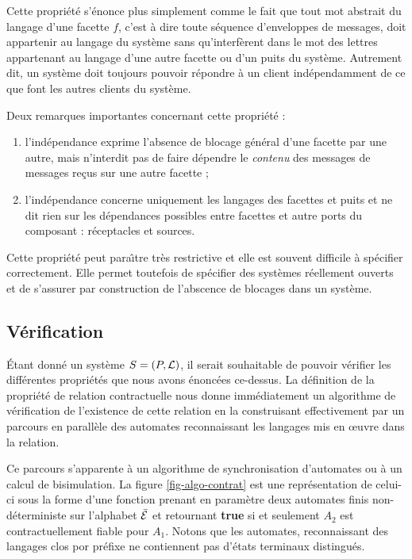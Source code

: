 Cette propri\'et\'e s'\'enonce plus simplement comme le fait que
tout mot abstrait du langage d'une facette $f$, c'est \`a dire toute
s\'equence d'enveloppes de messages, doit appartenir au langage du
syst\`eme  sans qu'interf\`erent dans le mot des lettres appartenant
au langage d'une autre facette ou d'un puits du syst\`eme. Autrement
dit, un syst\`eme doit toujours pouvoir \og r\'epondre \fg{} \`a un
client ind\'ependamment de ce que font les autres clients du syst\`eme.

Deux remarques importantes concernant cette propri\'et\'e :
\begin{enumerate}
  \item l'ind\'ependance  exprime l'absence de
    blocage g\'en\'eral d'une facette par une autre, mais n'interdit
    pas de faire d\'ependre le \emph{contenu} des messages de messages
    re\c{c}us sur une autre facette ;
  \item l'ind\'ependance concerne uniquement les
    langages des facettes et puits et ne dit rien sur les d\'ependances
    possibles entre facettes et autre ports du composant :
    r\'eceptacles et sources. 
\end{enumerate}

Cette propri\'et\'e peut para\^{\i}tre tr\`es restrictive et elle est
souvent difficile \`a sp\'ecifier correctement. Elle permet
toutefois de sp\'ecifier des syst\`emes r\'eellement ouverts et de
s'assurer par construction de l'abscence de blocages dans un
syst\`eme.

\subsection{V\'erification}

\'Etant donn\'e un syst\`eme $S=(P,{\cal L})$, 
il serait souhaitable de pouvoir v\'erifier les diff\'erentes
propri\'et\'es que nous avons \'enonc\'ees ce-dessus. 
La d\'efinition de la propri\'et\'e de relation contractuelle nous
donne imm\'ediatement un algorithme de v\'erification de l'existence
de cette relation en la construisant effectivement par un parcours en
parall\`ele des automates reconnaissant les langages mis en \oe uvre
dans la relation. 

Ce parcours s'apparente \`a un algorithme de synchronisation
d'automates ou \`a un calcul de bisimulation. La figure
\ref{fig-algo-contrat} est une
repr\'esentation de celui-ci sous la forme d'une fonction prenant en
param\`etre deux automates finis non-d\'eterministe sur l'alphabet
$\bar{\cal E}$ et retournant \textbf{true} 
si et seulement $A_2$ est contractuellement fiable pour $A_1$. Notons
que les automates, reconnaissant des langages clos por pr\'efixe ne
contiennent pas d'\'etats terminaux distingu\'es.

